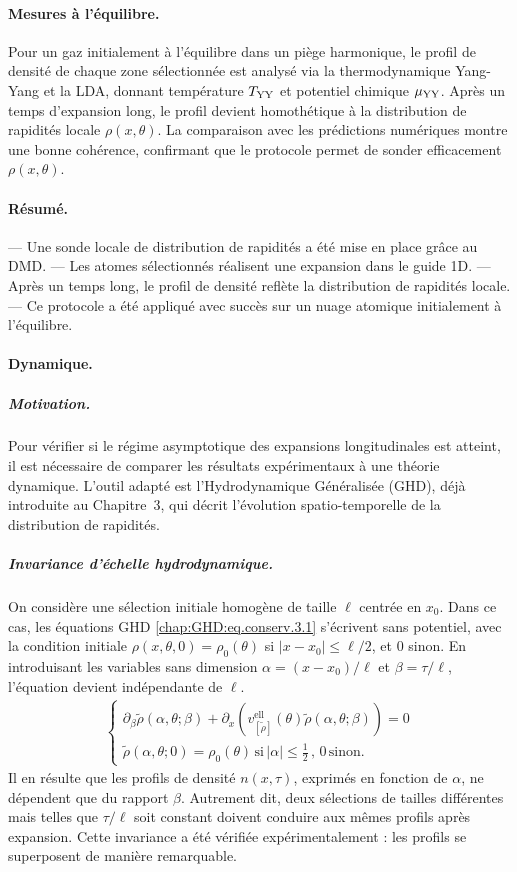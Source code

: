 \paragraph{Mesures à l’équilibre.}  
Pour un gaz initialement à l’équilibre dans un piège harmonique, le profil de densité de chaque zone sélectionnée est analysé via la thermodynamique Yang-Yang et la LDA, donnant température \(T_{\rm YY}\) et potentiel chimique \(\mu_{\rm YY}\). Après un temps d’expansion long, le profil devient homothétique à la distribution de rapidités locale \(\rho(x,\theta)\). La comparaison avec les prédictions numériques montre une bonne cohérence, confirmant que le protocole permet de sonder efficacement \(\rho(x,\theta)\).

\paragraph{Résumé.}  
— Une sonde locale de distribution de rapidités a été mise en place grâce au DMD.  
— Les atomes sélectionnés réalisent une expansion dans le guide 1D.  
— Après un temps long, le profil de densité reflète la distribution de rapidités locale.  
— Ce protocole a été appliqué avec succès sur un nuage atomique initialement à l’équilibre.

\paragraph{Dynamique.}
\subparagraph{Motivation.}
Pour vérifier si le régime asymptotique des expansions longitudinales est atteint, il est nécessaire de comparer les résultats expérimentaux à une théorie dynamique. L’outil adapté est l’Hydrodynamique Généralisée (GHD), déjà introduite au Chapitre~3, qui décrit l’évolution spatio-temporelle de la distribution de rapidités.

\subparagraph{Invariance d’échelle hydrodynamique.}
On considère une sélection initiale homogène de taille $\ell$ centrée en $x_0$. Dans ce cas, les équations GHD \eqref{chap:GHD:eq.conserv.3.1} s’écrivent sans potentiel, avec la condition initiale $\rho(x,\theta,0)=\rho_0(\theta)$ si $|x-x_0|\leq \ell/2$, et $0$ sinon. En introduisant les variables sans dimension $\alpha=(x-x_0)/\ell$ et $\beta=\tau/\ell$, l’équation devient indépendante de $\ell$. 
\begin{eqnarray*}
	\left \{ 
	\begin{array}{rcl}
		\partial_\beta \tilde{\rho} ( \alpha , \theta ; \beta ) +  \partial_x ( v^{\mathrm{ell}}_{[\tilde{\rho}]} (\theta)  \tilde{\rho} ( \alpha , \theta ; \beta )) = 0 \\
		\tilde{\rho} ( \alpha , \theta ; 0 )	 = \rho_0(\theta) \, \mbox{si} \, \vert \alpha \vert \leq \frac12 \,, \,  0 \, \mbox{sinon}.
	\end{array}
	\right .
\end{eqnarray*}
Il en résulte que les profils de densité $n(x,\tau)$, exprimés en fonction de $\alpha$, ne dépendent que du rapport $\beta$. 
Autrement dit, deux sélections de tailles différentes mais telles que $\tau/\ell$ soit constant doivent conduire aux mêmes profils après expansion. Cette invariance a été vérifiée expérimentalement : les profils se superposent de manière remarquable.

